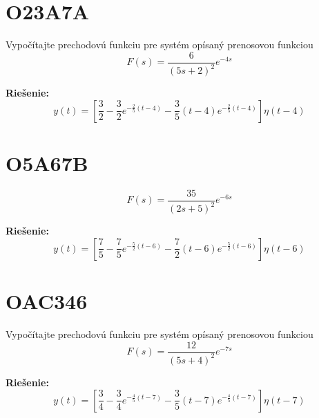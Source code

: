 \documentclass[a4paper, 12pt]{article}
\newenvironment{task}{}{}
\newenvironment{solution}{\noindent\textbf{Riešenie:}}{}
\begin{document}
\section*{O23A7A}
\begin{task}
    Vypočítajte prechodovú funkciu pre systém opísaný prenosovou funkciou
    \begin{equation*}
        F(s)=\dfrac{6}{(5s+2)^2}e^{-4s}
    \end{equation*}
\end{task} 

\begin{solution}
    \begin{equation*}
        y(t)=\left[ \dfrac{3}{2}-\dfrac{3}{2}e^{-\frac{2}{5}(t-4)}-\dfrac{3}{5}(t-4)e^{-\frac{2}{5}(t-4)} \right] \eta(t-4)
    \end{equation*}
\end{solution}



\section*{O5A67B}
\begin{task}
        
    \begin{equation*}
        F(s)=\dfrac{35}{(2s+5)^2}e^{-6s}
    \end{equation*}
\end{task} 

\begin{solution}
    \begin{equation*}
        y(t)=\left[ \dfrac{7}{5}-\dfrac{7}{5}e^{-\frac{5}{2}(t-6)}-\dfrac{7}{2}(t-6)e^{-\frac{5}{2}(t-6)} \right] \eta(t-6)
    \end{equation*}
\end{solution}


\section*{OAC346}
\begin{task}
    Vypočítajte prechodovú funkciu pre systém opísaný prenosovou funkciou
    \begin{equation*}
        F(s)=\dfrac{12}{(5s+4)^2}e^{-7s}
    \end{equation*}
\end{task} 

\begin{solution}
    \begin{equation*}
        y(t)=\left[ \dfrac{3}{4}-\dfrac{3}{4}e^{-\frac{4}{5}(t-7)}-\dfrac{3}{5}(t-7)e^{-\frac{4}{5}(t-7)} \right] \eta(t-7)
    \end{equation*}
\end{solution}
\end{document}
